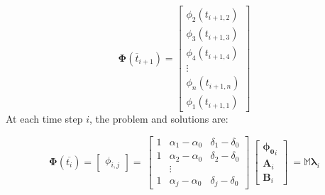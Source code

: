 	\[\boldsymbol{\Phi}\left(\overline{t}_{i+1}\right) =
	\begin{bmatrix}
	\phi_2(t_{i+1,2}) \\
	\phi_3(t_{i+1,3}) \\
	\phi_4(t_{i+1,4}) \\
	\vdots \\
	\phi_n(t_{i+1,n}) \\
	\phi_1(t_{i+1,1}) 	    
	\end{bmatrix}
	\]	
	At each time step $i$, the problem and solutions are:
	
	\[\boldsymbol{\Phi}\left(\overline{t_i}\right) =
	\begin{bmatrix}
	\phi_{i,j}	    
	\end{bmatrix}
	=  \
	\begin{bmatrix}
	1& \alpha_1-\alpha_0& \delta_1-\delta_0\\
	1& \alpha_2-\alpha_0 &\delta_2-\delta_0\\
	&\vdots& \\
	1& \alpha_j-\alpha_0 &\delta_j-\delta_0
	\end{bmatrix}
	\
	\begin{bmatrix}
	\boldsymbol{\phi_0}_i \\
	\textbf{A}_i \\ \textbf{B}_i
	\end{bmatrix}
	\ 	    
	= \mathbb{M} \boldsymbol{\lambda}_i
	\]
	
